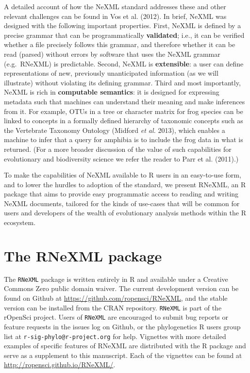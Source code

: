 \documentclass[author-year, review, 11pt]{components/elsarticle} %
\begin{document}
A detailed account of how the NeXML standard addresses these and other
relevant challenges can be found in Vos et al. (2012). In brief, NeXML
was designed with the following important properties. First, NeXML is
defined by a precise grammar that can be programmatically
\textbf{validated}; i.e., it can be verified whether a file precisely
follows this grammar, and therefore whether it can be read (parsed)
without errors by software that uses the NeXML grammar (e.g.~RNeXML) is
predictable. Second, NeXML is \textbf{extensible}: a user can define
representations of new, previously unanticipated information (as we will
illustrate) without violating its defining grammar. Third and most
importantly, NeXML is rich in \textbf{computable semantics}: it is
designed for expressing metadata such that machines can understand their
meaning and make inferences from it. For example, OTUs in a tree or
character matrix for frog species can be linked to concepts in a
formally defined hierarchy of taxonomic concepts such as the Vertebrate
Taxonomy Ontology (Midford \emph{et al.} 2013), which enables a machine
to infer that a query for amphibia is to include the frog data in what
is returned. (For a more broader discussion of the value of such
capabilities for evolutionary and biodiversity science we refer the
reader to Parr et al. (2011).)

To make the capabilities of NeXML available to R users in an easy-to-use
form, and to lower the hurdles to adoption of the standard, we present
RNeXML, an R package that aims to provide easy programmatic access to
reading and writing NeXML documents, tailored for the kinds of use-cases
that will be common for users and developers of the wealth of
evolutionary analysis methods within the R ecosystem.

\section{The RNeXML package}\label{the-rnexml-package}

The \texttt{RNeXML} package is written entirely in R and available under
a Creative Commons Zero public domain waiver. The current development
version can be found on Github at
\href{}{\url{https://github.com/ropensci/RNeXML}}, and the stable
version can be installed from the CRAN repository. \texttt{RNeXML} is
part of the rOpenSci project. Users of \texttt{RNeXML} are encouraged to
submit bug reports or feature requests in the issues log on Github, or
the phylogenetics R users group list at
\texttt{r-sig-phylo@r-project.org} for help. Vignettes with more
detailed examples of specific features of RNeXML are distributed with
the R package and serve as a supplement to this manuscript. Each of the
vignettes can be found at
\href{}{\url{http://ropensci.github.io/RNeXML/}}.
\end{document}

